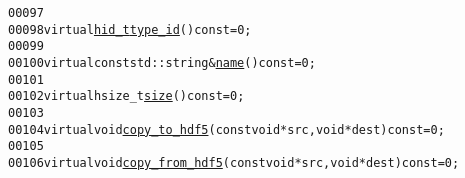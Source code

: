 \begin{footnotesize}
\begin{alltt}
00097 
00098             \textcolor{keyword}{virtual} \hyperlink{namespaceeos_1_1hdf5_a5bd5e209f1bf36cdc5551465dacf2e74}{hid_t} \hyperlink{structeos_1_1hdf5_1_1Type_a0305c470a7a26a391f9a751e40bb9ff6}{type_id}() \textcolor{keyword}{const} = 0;
00099 
00100             \textcolor{keyword}{virtual} \textcolor{keyword}{const} std::string & \hyperlink{structeos_1_1hdf5_1_1Type_a79de1c9f0444de59864107c388c23d2d}{name}() \textcolor{keyword}{const} = 0;
00101 
00102             \textcolor{keyword}{virtual} hsize\_t \hyperlink{structeos_1_1hdf5_1_1Type_a0cf79b090412bb228a1df8349acf3c2b}{size}() \textcolor{keyword}{const} = 0;
00103 
00104             \textcolor{keyword}{virtual} \textcolor{keywordtype}{void} \hyperlink{structeos_1_1hdf5_1_1Type_a30b665dc2adbe459feb640c61776b50a}{copy_to_hdf5}(\textcolor{keyword}{const} \textcolor{keywordtype}{void} * src, \textcolor{keywordtype}{void} * dest) \textcolor{keyword}{const} = 0;
00105 
00106             \textcolor{keyword}{virtual} \textcolor{keywordtype}{void} \hyperlink{structeos_1_1hdf5_1_1Type_a4d1073336bce1500533e69a1187acd66}{copy_from_hdf5}(\textcolor{keyword}{const} \textcolor{keywordtype}{void} * src, \textcolor{keywordtype}{void} * dest) \textcolor{keyword}{const} = 0;
      

\end{alltt}
\end{footnotesize}
